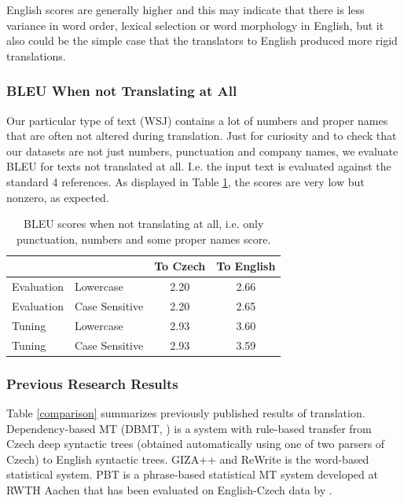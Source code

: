 \documentclass[10pt]{report}
\theoremstyle{plain}
\begin{document}
{{English scores are generally higher and this may indicate that there is less variance
in word order, lexical selection or word morphology in English, but it also
could be the simple case that the translators to English produced more rigid
translations.


\subsubsection{BLEU When not Translating at All}

Our particular type of text (WSJ) contains a lot of numbers and proper names
that are often not altered during translation. Just for curiosity and to 
check that our datasets are not just numbers, punctuation and company names, we
evaluate BLEU for texts not translated at all. I.e. the input text is evaluated
against the standard 4 references. As displayed in Table
\ref{nontransl}, the scores are very low but nonzero, as expected.

\begin{table}[ht]
\begin{center}
\begin{tabular}{llcc}
   &     &  To Czech   &  To English\\
\hline
Evaluation   &  Lowercase   &  2.20  &  2.66\\
Evaluation   &  Case Sensitive   &  2.20  &  2.65\\
Tuning   &  Lowercase   &  2.93  &  3.60\\
Tuning   &  Case Sensitive   &  2.93  &  3.59\\
\end{tabular}
\end{center}
\caption{BLEU scores when not translating at all, i.e. only punctuation, numbers
and some proper names score.}
\label{nontransl}
\end{table}


\subsubsection{Previous Research Results}

Table \ref{comparison} summarizes previously published results of \toen{}
translation. Dependency-based MT (DBMT, )
is a system with rule-based transfer from Czech deep syntactic trees (obtained
automatically using one of two parsers of Czech) to English
syntactic trees. GIZA++  and ReWrite
 is the  word-based statistical system.
PBT  is a phrase-based statistical
MT system developed at RWTH Aachen that has been evaluated on English-Czech data
by .


}}
\end{document}
